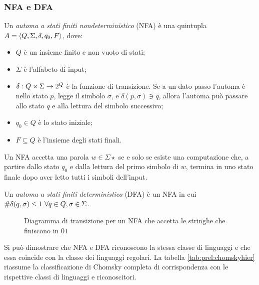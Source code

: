 \subsubsection{NFA e DFA}
\begin{defin}
	Un \emph{automa a stati finiti nondeterministico} (NFA) è una quintupla $A=\langle Q,\Sigma,\delta,q_0,F \rangle$, dove:
	\begin{itemize}
		\item $Q$ è un insieme finito e non vuoto di stati;
		\item $\Sigma$ è l'alfabeto di input;
		\item $\delta:Q\times\Sigma\to2^{Q}$ è la funzione di transizione. Se a un dato passo l'automa è nello stato $p$, legge il simbolo $\sigma$, e $\delta(p,\sigma)\ni q$, allora l'automa può passare allo stato $q$ e alla lettura del simbolo successivo;
		\item $q_0\in Q$ è lo stato iniziale;
		\item $F\subseteq Q$ è l'insieme degli stati finali.
	\end{itemize}
	Un NFA accetta una parola $w\in\Sigma\star$ se e solo se esiste una computazione che, a partire dallo stato $q_0$ e dalla lettura del primo simbolo di $w$, termina in uno stato finale dopo aver letto tutti i simboli dell'input.
\end{defin}
\begin{defin}
	Un \emph{automa a stati finiti deterministico} (DFA) è un NFA in cui $\# \delta(q,\sigma)\leq 1 ~ \forall q\in Q,\sigma\in\Sigma$.
\end{defin}

\begin{figure}
	\centering
	
	\caption{Diagramma di transizione per un NFA che accetta le stringhe che finiscono in $01$}
\end{figure}

Si può dimostrare che NFA e DFA riconoscono la stessa classe di linguaggi e che essa coincide con la classe dei linguaggi regolari. La tabella \ref{tab:prel:chomskyhier} riassume la classificazione di Chomsky completa di corrispondenza con le rispettive classi di linguaggi e riconoscitori.

